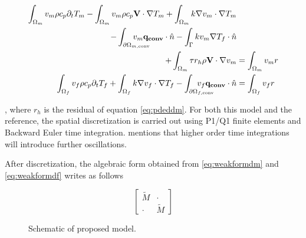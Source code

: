\begin{align}
  \label{eq:weakformdm}
    \int_{\Omega_m} v_m \rho c_p \partial_t T_m 
  - \int_{\Omega_m} v_m \rho c_p \mathbf{V} \cdot \nabla T_m
  + \int_{\Omega_m} k \nabla v_m \cdot \nabla T_m&\\
  - \int_{\partial \Omega_{m, \textrm{conv}}} \hspace{-8mm} v_m \mathbf{q_{conv}} \cdot \hat{n}
  - \int_{\Gamma} k v_m \nabla T_f \cdot \hat{n} &\notag\\
  + \int_{\Omega_m} \tau r_h  \rho \mathbf{V} \cdot \nabla v_m &= \int_{\Omega_m} v_m r \notag\\
  \label{eq:weakformdf}
    \int_{\Omega_f} v_f \rho c_p \partial_t T_f 
  + \int_{\Omega_f} k \nabla v_f \cdot \nabla T_f
  - \int_{\partial \Omega_{f, \textrm{conv}}} \hspace{-8mm} v_f \mathbf{q_{conv}} \cdot \hat{n} &= \int_{\Omega_f} v_f r
\end{align}

, where $r_h$ is the residual of equation \ref{eq:pdeddm}.
For both this model and the reference, the spatial discretization
is carried out using P1/Q1 finite elements and Backward Euler
time integration. \cite{Puso2023} mentions that higher order
time integrations will introduce further oscillations.\par

After discretization, the algebraic form obtained from
\ref{eq:weakformdm} and \ref{eq:weakformdf} writes as follows

\begin{equation}\label{eq:algebraic_coupled}
  \begin{bmatrix}
    \tilde{M} & \cdot \\
    \cdot & \tilde{M}
  \end{bmatrix}
\end{equation}

\par
{}\par

\begin{figure}
  \caption{Schematic of proposed model.}
  \label{fig:schematic}
\end{figure}


\iffalse
Show reference model
Go over limitations
Introduce my model
\fi
